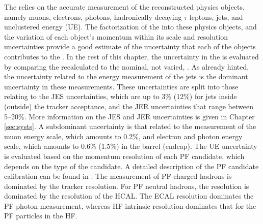 The \ptmiss relies on the accurate measurement of the reconstructed physics objects, namely muons, electrons, photons, hadronically decaying $\tau$ leptons, jets, and unclustered energy (UE). 
The factorization of the \ptmiss into these physics objects, and the variation of each object's momentum within its scale and resolution uncertainties provide a good estimate of the uncertainty 
that each of the objects contributes to the \ptmiss. 
\newpara
\noindent\justify
In the rest of this chapter, the uncertainty in the \ptmiss is evaluated by comparing the recalculated \ptmiss to the nominal, not varied, \ptmiss. 
As already hinted, the uncertainty related to the energy measurement of the jets is the dominant uncertainty in these measurements. 
These uncertainties are split into those relating to the JES uncertainties, which are up to 3\% (12\%) for jets inside (outside) the tracker acceptance, and the JER uncertainties that range between 5--20\%.
More information on the JES and JER uncertainties is given in Chapter \ref{sec:systs}. 
A subdominant uncertainty is that related to the measurement of the muon energy scale, which amounts to 0.2\%, and electron and photon energy scale, which amounts to 0.6\% (1.5\%) in the barrel (endcap). 
The UE uncertainty is evaluated based on the momentum resolution of each PF candidate, which depends on the type of the candidate. 
A detailed description of the PF candidate calibration can be found in \cite{Sirunyan:2017ulk,Chatrchyan:2014fea,Khachatryan:2015iwa}.  
The \pt measurement of PF charged hadrons is dominated by the tracker resolution. 
For PF neutral hadrons, the \pt resolution is dominated by the resolution of the HCAL. 
The ECAL resolution dominates the PF photon \pt measurement, whereas HF intrinsic resolution dominates that for the PF particles in the HF. 
